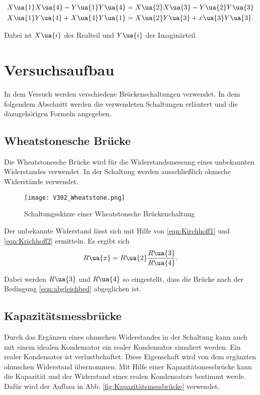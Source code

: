 \begin{align}
  X\ua{1}X\ua{4} - Y\ua{1}Y\ua{4} &= X\ua{2}X\ua{3} - Y\ua{2}Y\ua{3}\label{eqn:RealteilAbgleichbed}\\
  X\ua{1}Y\ua{4} + X\ua{4}Y\ua{1} &= X\ua{2}Y\ua{3} + x\ua{3}Y\ua{3}\label{enq:ImaginärteilAbgleichbed}.
\end{align}

Dabei ist $X\ua{i}$ der Realteil und $Y\ua{i}$ der Imaginärteil.

\section{Versuchsaufbau}

In dem Versuch werden verschiedene Brückenschaltungen verwendet. In dem folgendem
Abschnitt werden die verwendeten Schaltungen erläutert und die dazugehörigen
Formeln angegeben.

\subsection{Wheatstonesche Brücke}

Die Wheatstonesche Brücke wird für die Widerstandsmessung eines unbekannten
Widerstandes verwendet. In der Schaltung werden ausschließlich ohmsche Widerstände
verwendet.

\FloatBarrier
\begin{figure}
  \texttt{[image: V302\_Wheatstone.png]}
  \caption{Schaltungsskizze einer Wheatstonsche Brückenchaltung\cite{anleitung01}}
  \label{fig:Wheatstone}
\end{figure}
\FloatBarrier

Der unbekannte Widerstand lässt sich mit Hilfe von \eqref{eqn:Kirchhoff1} und
\eqref{eqn:Krichhoff2} ermitteln. Es ergibt sich
\begin{equation}
  \label{eqn:Wheatstone}
  R\ua{x} = R\ua{2}\frac{R\ua{3}}{R\ua{4}}.
\end{equation}

Dabei werden $R\ua{3}$ und $R\ua{4}$ so eingestellt, dass die Brücke nach
der Bedingung \eqref{eqn:abgleichbed} abgeglichen ist.

\subsection{Kapazitätsmessbrücke}

Durch das Ergänzen eines ohmschen Widerstandes in der Schaltung kann auch mit
einem idealen Kondensator ein realer Kondensator simuliert werden.
Ein realer Kondensator ist verlustbehaftet.
Diese Eigenschaft wird von dem ergänzten ohmschen Widerstand übernommen.
Mit Hilfe einer Kapazitätsmessbrücke kann die Kapazität und der Widerstand eines
realen Kondensators bestimmt werde.
Dafür wird der Aufbau in Abb. \ref{fig:Kapazitätsmessbrücke} verwendet.

